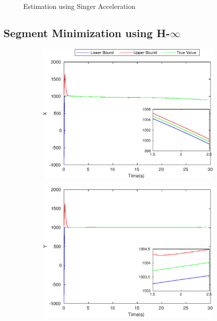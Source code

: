 \begin{figure}[h]
\begin{subfigure}{.5\linewidth}
\end{subfigure}
\caption{Estimation using Singer Acceleration}
\end{figure}



\subsection{Segment Minimization using H-$\infty$}
\FloatBarrier
\begin{figure}[h]
\begin{subfigure}{.5\linewidth}
\centering
\includegraphics[width=\linewidth]{figures/HInf/s3cvHInfX}
\end{subfigure}
\begin{subfigure}{.5\linewidth}
\centering
\includegraphics[width=\linewidth]{figures/HInf/s3cvHInfY}

\end{subfigure}
\end{figure}
